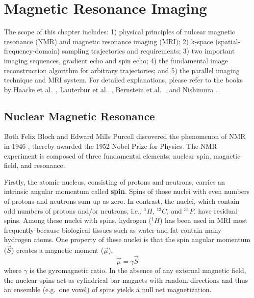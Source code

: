 \chapter{Magnetic Resonance Imaging}
 \label{Chp:MRI}

The scope of this chapter includes: 1) physical principles of nulcear magnetic resonance (\acs{NMR}) and magnetic resonance imaging (\acs{MRI}); 2) k-space (spatial-frequency-domain) sampling trajectories and requirements; 3) two important imaging sequences, gradient echo and spin echo; 4) the fundamental image reconstruction algorithm for arbitrary trajectories; and 5) the parallel imaging technique and MRI system. For detailed explanations, please refer to the books by Haacke et al.~\cite{1999_MRI}, Lauterbur et al.~\cite{2000_MRI_Liang}, Bernstein et al.~\cite{2004_MRI_Bernstein}, and Nishimura \cite{2010_principle_mri}.

\section{Nuclear Magnetic Resonance}
Both Felix Bloch and Edward Mills Purcell discovered the phenomenon of NMR in 1946 \cite{1946_NMR_Purcell,1946_NMR_Bloch}, thereby awarded the 1952 Nobel Prize for Physics. The NMR experiment is composed of three fundamental elements: nuclear spin, magnetic field, and resonance.

Firstly, the atomic nucleus, consisting of protons and neutrons, carries an intrinsic angular momentum called \textbf{spin}. Spins of those nuclei with even numbers of protons and neutrons sum up as zero. In contrast, the nuclei, which contain odd numbers of protons and/or neutrons, i.e., $^{1}H$, $^{13}C$, and $^{31}P$, have residual spins. Among these nuclei with spins, hydrogen ($^{1}H$) has been used in MRI most frequently because biological tissues such as water and fat contain many hydrogen atoms. One property of these nuclei is that the spin angular momentum ($\vec{S}$) creates a magnetic moment ($\vec{\mu}$),
\begin{equation}
  \vec{\mu} = \gamma \vec{S} 
\end{equation}
where $\gamma$ is the gyromagnetic ratio. In the absence of any external magnetic field, the nuclear spins act as cylindrical bar magnets with random directions and thus an ensemble (e.g.~one voxel) of spins yields a null net magnetization.

